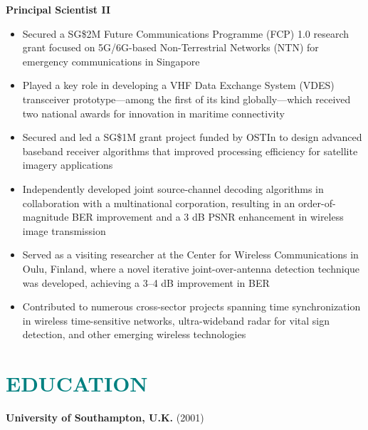 \documentclass[a4paper, 11pt]{article}
\begin{document}
	\vspace{3pt}
		
	{\raggedleft \large \bf Principal Scientist II}
		
	\vspace{3pt}
		
	\begin{itemize}[leftmargin=*, itemsep=-1mm]
			
		\item Secured a SG\$2M Future Communications Programme (FCP) 1.0 research grant focused on 5G/6G-based Non-Terrestrial Networks (NTN) for emergency communications in Singapore 
		
		\item Played a key role in developing a VHF Data Exchange System (VDES) transceiver prototype—among the first of its kind globally—which received two national awards for innovation in maritime connectivity 
		
		\item Secured and led a SG\$1M grant project funded by OSTIn to design advanced baseband receiver algorithms that improved processing efficiency for satellite imagery applications 
		
		\item Independently developed joint source-channel decoding algorithms in collaboration with a multinational corporation, resulting in an order-of-magnitude BER improvement and a 3 dB PSNR enhancement in wireless image transmission  
		
		\item Served as a visiting researcher at the Center for Wireless Communications in Oulu, Finland, where a novel iterative joint-over-antenna detection technique was developed, achieving a 3–4 dB improvement in BER
		
		\item Contributed to numerous cross-sector projects spanning time synchronization in wireless time-sensitive networks, ultra-wideband radar for vital sign detection, and other emerging wireless technologies
			
	\end{itemize}
		
		
\section{\textcolor{teal}{\bf{EDUCATION}}}

	\vspace{3pt}
	
	{\bf University of Southampton, U.K.} (2001)
	
\end{document}
